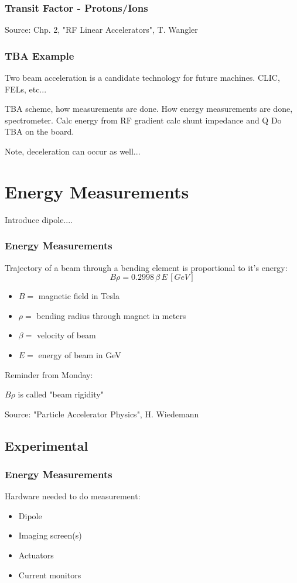 \documentclass[professionalfonts,t]{beamer}
\begin{document}
\begin{frame}
\frametitle{Transit Factor - Protons/Ions}
\vspace{1em}
Source: Chp. 2, "RF Linear Accelerators", T. Wangler
\end{frame}

\begin{frame}
	\frametitle{TBA Example}

	
	Two beam acceleration is a candidate technology for future machines.
	CLIC, FELs, etc...
	
	TBA scheme, how measurements are done. 
How energy measurements are done, spectrometer.
Calc energy from RF gradient
calc shunt impedance and Q
Do TBA on the board.	

	Note, deceleration can occur as well...
	
\end{frame}



\section{Energy Measurements}
\begin{frame}
	Introduce dipole....
\end{frame}

\begin{frame}
	\frametitle{Energy Measurements}
	Trajectory of a beam through a bending element is proportional to it's energy:
	\begin{equation}
		B \rho = 0.2998 \, \beta \, E \, [GeV]
	\end{equation}
	\begin{itemize}
		\item $B = $ magnetic field in Tesla
		\item $\rho =$ bending radius through magnet in meters
		\item $\beta =$ velocity of beam
		\item $E = $ energy of beam in GeV 
	\end{itemize}

\vspace{1em}
Reminder from Monday:

$B\rho$ is called "beam rigidity"

\vspace{1em}
Source: "Particle Accelerator Physics", H. Wiedemann
\end{frame}

\subsection{Experimental}
\begin{frame}
	\frametitle{Energy Measurements}
	Hardware needed to do measurement:

		\begin{itemize}
			\item Dipole
			\item Imaging screen(s)
			\item Actuators
			\item Current monitors
		\end{itemize}
\end{frame}
\end{document}
